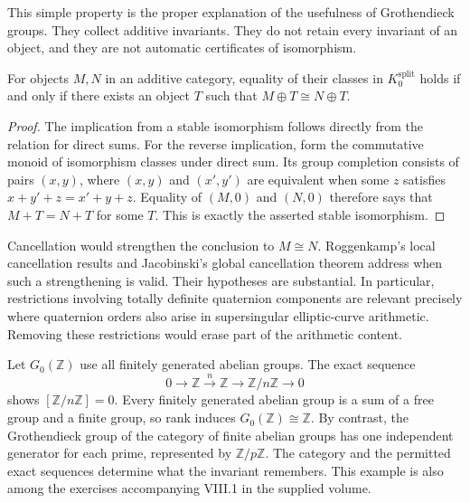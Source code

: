 This simple property is the proper explanation of the usefulness of Grothendieck groups. They collect additive invariants. They do not retain every invariant of an object, and they are not automatic certificates of isomorphism.

\begin{proposition}
For objects $M,N$ in an additive category, equality of their classes in $K_0^{\mathrm{split}}$ holds if and only if there exists an object $T$ such that $M\oplus T\cong N\oplus T$.
\end{proposition}
\begin{proof}
The implication from a stable isomorphism follows directly from the relation for direct sums. For the reverse implication, form the commutative monoid of isomorphism classes under direct sum. Its group completion consists of pairs $(x,y)$, where $(x,y)$ and $(x',y')$ are equivalent when some $z$ satisfies $x+y'+z=x'+y+z$. Equality of $(M,0)$ and $(N,0)$ therefore says that $M+T=N+T$ for some $T$. This is exactly the asserted stable isomorphism.
\end{proof}

Cancellation would strengthen the conclusion to $M\cong N$. Roggenkamp's local cancellation results and Jacobinski's global cancellation theorem address when such a strengthening is valid. Their hypotheses are substantial. In particular, restrictions involving totally definite quaternion components are relevant precisely where quaternion orders also arise in supersingular elliptic-curve arithmetic. Removing these restrictions would erase part of the arithmetic content.\cite[Chapters VI--VIII]{v2Roggenkamp1970II}

\begin{example}
Let $G_0(\mathbb Z)$ use all finitely generated abelian groups. The exact sequence
\[
0\longrightarrow\mathbb Z\xrightarrow{\,n\,}\mathbb Z
 \longrightarrow\mathbb Z/n\mathbb Z\longrightarrow0
\]
shows $[\mathbb Z/n\mathbb Z]=0$. Every finitely generated abelian group is a sum of a free group and a finite group, so rank induces $G_0(\mathbb Z)\cong\mathbb Z$. By contrast, the Grothendieck group of the category of finite abelian groups has one independent generator for each prime, represented by $\mathbb Z/p\mathbb Z$. The category and the permitted exact sequences determine what the invariant remembers. This example is also among the exercises accompanying VIII.1 in the supplied volume.\cite{v2Roggenkamp1970II}
\end{example}

